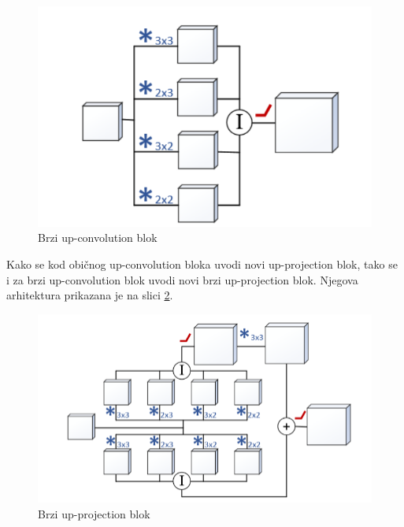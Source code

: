 \documentclass[times, utf8, zavrsni, numeric]{fer}
\begin{document}
\begin{figure}[htb]
	\centering
	\includegraphics[scale=0.45]{fast-conv.png}
	\caption{Brzi up-convolution blok}
	\label{fig:fastc}
\end{figure}
Kako se kod običnog up-convolution bloka uvodi novi up-projection blok, tako
se i za brzi up-convolution blok uvodi novi brzi up-projection blok. Njegova
arhitektura prikazana je na slici \ref{fig:fastp}.
\begin{figure}[htb]
	\centering
	\includegraphics[scale=0.45]{fast-proj.png}
	\caption{Brzi up-projection blok}
	\label{fig:fastp}
\end{figure}
\end{document}

